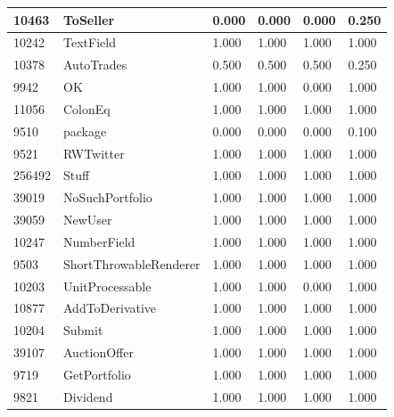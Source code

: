 \documentclass[a4paper]{article}
\newlength{\DUtablewidth} %
\begin{document}
\begin{longtable*}[c]{|p{0.160\DUtablewidth}|p{0.160\DUtablewidth}|p{0.160\DUtablewidth}|p{0.160\DUtablewidth}|p{0.160\DUtablewidth}|p{0.160\DUtablewidth}|}
10463
 & 
ToSeller
 & 
0.000
 & 
0.000
 & 
0.000
 & 
0.250
 \\
\hline

10242
 & 
TextField
 & 
1.000
 & 
1.000
 & 
1.000
 & 
1.000
 \\
\hline

10378
 & 
AutoTrades
 & 
0.500
 & 
0.500
 & 
0.500
 & 
0.250
 \\
\hline

9942
 & 
OK
 & 
1.000
 & 
1.000
 & 
0.000
 & 
1.000
 \\
\hline

11056
 & 
ColonEq
 & 
1.000
 & 
1.000
 & 
1.000
 & 
1.000
 \\
\hline

9510
 & 
package
 & 
0.000
 & 
0.000
 & 
0.000
 & 
0.100
 \\
\hline

9521
 & 
RWTwitter
 & 
1.000
 & 
1.000
 & 
1.000
 & 
1.000
 \\
\hline

256492
 & 
Stuff
 & 
1.000
 & 
1.000
 & 
1.000
 & 
1.000
 \\
\hline

39019
 & 
NoSuchPortfolio
 & 
1.000
 & 
1.000
 & 
1.000
 & 
1.000
 \\
\hline

39059
 & 
NewUser
 & 
1.000
 & 
1.000
 & 
1.000
 & 
1.000
 \\
\hline

10247
 & 
NumberField
 & 
1.000
 & 
1.000
 & 
1.000
 & 
1.000
 \\
\hline

9503
 & 
ShortThrowableRenderer
 & 
1.000
 & 
1.000
 & 
1.000
 & 
1.000
 \\
\hline

10203
 & 
UnitProcessable
 & 
1.000
 & 
1.000
 & 
0.000
 & 
1.000
 \\
\hline

10877
 & 
AddToDerivative
 & 
1.000
 & 
1.000
 & 
1.000
 & 
1.000
 \\
\hline

10204
 & 
Submit
 & 
1.000
 & 
1.000
 & 
1.000
 & 
1.000
 \\
\hline

39107
 & 
AuctionOffer
 & 
1.000
 & 
1.000
 & 
1.000
 & 
1.000
 \\
\hline

9719
 & 
GetPortfolio
 & 
1.000
 & 
1.000
 & 
1.000
 & 
1.000
 \\
\hline

9821
 & 
Dividend
 & 
1.000
 & 
1.000
 & 
1.000
 & 
1.000
 \\
\hline


\end{longtable*}
\end{document}
